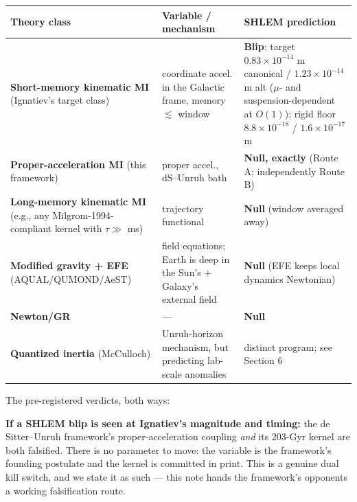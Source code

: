 \documentclass[
]{article}
\newcounter{none} %
\begin{document}
{\def\LTcaptype{none} %
\begin{longtable}[]{@{}
  >{\raggedright\arraybackslash}p{}
  >{\raggedright\arraybackslash}p{}
  >{\raggedright\arraybackslash}p{}@{}}
\toprule\noalign{}
\begin{minipage}[b]{\linewidth}\raggedright
Theory class
\end{minipage} & \begin{minipage}[b]{\linewidth}\raggedright
Variable / mechanism
\end{minipage} & \begin{minipage}[b]{\linewidth}\raggedright
SHLEM prediction
\end{minipage} \\
\midrule\noalign{}
\endhead
\bottomrule\noalign{}
\endlastfoot
\textbf{Short-memory kinematic MI} (Ignatiev's target class) &
coordinate accel. in the Galactic frame, memory \(\lesssim\) window &
\textbf{Blip}: target \(0.83\times10^{-14}\) m canonical /
\(1.23\times10^{-14}\) m alt (\(\mu\)- and suspension-dependent at
\(O(1)\)); rigid floor \(8.8\times10^{-18}\) / \(1.6\times10^{-17}\)
m \\
\textbf{Proper-acceleration MI} (this framework) & proper accel.,
dS--Unruh bath & \textbf{Null, exactly} (Route A; independently Route
B) \\
\textbf{Long-memory kinematic MI} (e.g., any Milgrom-1994-compliant
kernel with \(\tau \gg\) ms) & trajectory functional & \textbf{Null}
(window averaged away) \\
\textbf{Modified gravity + EFE} (AQUAL/QUMOND/AeST) & field equations;
Earth is deep in the Sun's + Galaxy's external field & \textbf{Null}
(EFE keeps local dynamics Newtonian) \\
\textbf{Newton/GR} & --- & \textbf{Null} \\
\textbf{Quantized inertia} (McCulloch) & Unruh-horizon mechanism, but
predicting lab-scale anomalies & distinct program; see Section 6 \\
\end{longtable}
}

The pre-registered verdicts, both ways:

\textbf{If a SHLEM blip is seen at Ignatiev's magnitude and timing:} the
de Sitter--Unruh framework's proper-acceleration coupling \emph{and} its
203-Gyr kernel are both falsified. There is no parameter to move: the
variable is the framework's founding postulate and the kernel is
committed in print. This is a genuine dual kill switch, and we state it
as such --- this note hands the framework's opponents a working
falsification route.
\end{document}
